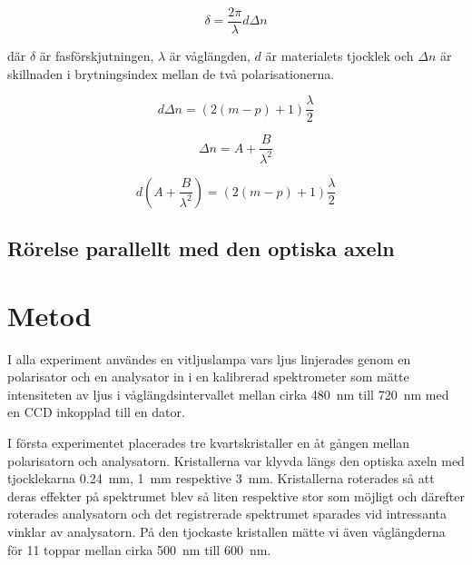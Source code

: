 \documentclass[a4paper]{article}
\begin{document}
\begin{equation}
	\delta = \frac{2\pi}{\lambda} d \Delta n
\end{equation}

där $\delta$ är fasförskjutningen, $\lambda$ är våglängden, $d$ är materialets tjocklek och $\Delta n$ är skillnaden i brytningsindex mellan de två polarisationerna.

\begin{equation}
	d \Delta n = \left(2 (m - p) + 1\right)\frac{\lambda}{2}
	\label{eq:deltaMax}
\end{equation}

\begin{equation}
	\Delta n = A + \frac{B}{\lambda^2}
	\label{eq:deltaCauchy}
\end{equation}

\begin{equation}
	d \left(A + \frac{B}{\lambda^2}\right) = \left(2 (m - p) + 1\right)\frac{\lambda}{2}
	\label{eq:cauchyMax}
\end{equation}

\subsection{Rörelse parallellt med den optiska axeln}

\section{Metod}
  
  I alla experiment användes en vitljuslampa vars ljus linjerades genom en polarisator och en analysator in i en kalibrerad spektrometer som mätte intensiteten av ljus i våglängdsintervallet mellan cirka \SI{480}{\nano\meter} till \SI{720}{\nano\meter} med en CCD inkopplad till en dator.
  
  I första experimentet placerades tre kvartskristaller en åt gången mellan polarisatorn och analysatorn. Kristallerna var klyvda längs den optiska axeln med tjocklekarna \SI{0.24}{\milli\meter}, \SI{1}{\milli\meter} respektive \SI{3}{\milli\meter}. Kristallerna roterades så att deras effekter på spektrumet blev så liten respektive stor som möjligt och därefter roterades analysatorn och det registrerade spektrumet sparades vid intressanta vinklar av analysatorn. På den tjockaste kristallen mätte vi även våglängderna för 11 toppar mellan cirka \SI{500}{\nano\meter} till \SI{600}{\nano\meter}.
  
\end{document}
